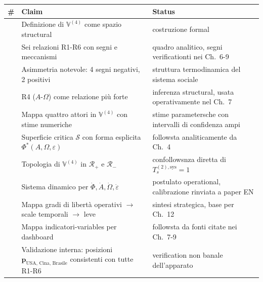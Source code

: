 {\def\LTcaptype{none} %
{\small\begin{longtable}[]{@{}
  >{\raggedright\arraybackslash}p{}
  >{\raggedright\arraybackslash}p{}
  >{\raggedright\arraybackslash}p{}@{}}
\toprule\noalign{}
\begin{minipage}[b]{\linewidth}\raggedright
\#
\end{minipage} & \begin{minipage}[b]{\linewidth}\raggedright
Claim
\end{minipage} & \begin{minipage}[b]{\linewidth}\raggedright
Status
\end{minipage} \\
\midrule\noalign{}
\endhead
\bottomrule\noalign{}
\endlastfoot
1 & Definizione di \(\mathbb{V}^{(4)}\) come spazio structural &
\Hypoth{} costruzione formal \\
2 & Sei relazioni R1-R6 con segni e meccanismi & \Hypoth{} quadro
analitico, segni verificationti nei Ch.~6-9 \\
3 & Asimmetria notevole: 4 segni negativi, 2 positivi & \Proved{}
struttura termodinamica del sistema sociale \\
4 & R4 (\(A\)-\(\Omega\)) come relazione più forte & \Hypoth{} inferenza
structural, usata operativamente nel Ch.~7 \\
5 & Mappa quattro attori in \(\mathbb{V}^{(4)}\) con stime numeriche &
\Conj{} stime parametersche con intervalli di confidenza ampi \\
6 & Superficie critica \(\mathcal{S}\) con forma esplicita
\(\Phi^*(A, \Omega, \varepsilon)\) & \Proved{} followsta analiticamente
da Ch.~4 \\
7 & Topologia di \(\mathbb{V}^{(4)}\) in \(\mathcal{R}_+\) e
\(\mathcal{R}_-\) & \Proved{} confollowsnza diretta di
\(T_s^{(2),\text{sys}} = 1\) \\
8 & Sistema dinamico per
\(\dot\Phi, \dot A, \dot\Omega, \dot\varepsilon\) & \Hypoth{} postulato
operational, calibrazione rinviata a paper EN \\
9 & Mappa gradi di libertà operativi \(\to\) scale temporali \(\to\)
leve & \Hypoth{} sintesi strategica, base per Ch.~12 \\
10 & Mappa indicatori-variables per dashboard & \Proved{} followsta da
fonti citate nei Ch.~7-9 \\
11 & Validazione interna: posizioni
\(\boldsymbol{p}_{\text{USA, Cina, Brasile}}\) consistenti con tutte
R1-R6 & \Proved{} verification non banale dell'apparato \\
\end{longtable}}
}



